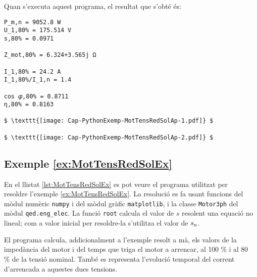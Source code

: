 Quan s'executa aquest programa, el resultat que s'obté és:
\lstset{
	language=,
	numbers=none,
	frame=none
}
\begin{lstlisting}[mathescape=true]
P_m,n = 9052.8 W
U_1,80% = 175.514 V
s,80% = 0.0971

Z_mot,80% = 6.324+3.565j Ω

I_1,80% = 24.2 A
I_1,80%/I_1,n = 1.4

cos 𝜑,80% = 0.8711
η,80% = 0.8163
	
$ \texttt{[image: Cap-PythonExemp-MotTensRedSolAp-1.pdf]} $

$ \texttt{[image: Cap-PythonExemp-MotTensRedSolAp-2.pdf]} $
\end{lstlisting} 



\hypertarget{exemple:MotTensRedSolEx}{\subsection{Exemple \ref*{ex:MotTensRedSolEx} \MotTensRedSolEx}}
En el llistat \vref{lst:MotTensRedSolEx} es pot veure el programa utilitzat per resoldre l'exemple \vref{ex:MotTensRedSolEx}. La resolució es fa usant funcions del mòdul numèric \texttt{numpy} i del mòdul gràfic \texttt{matplotlib}, i la classe \texttt{Motor3ph} del mòdul \texttt{qed.eng\_elec}. La funció \texttt{root} calcula el valor de $s$ resolent una equació no lineal; com a valor inicial per resoldre-la  s'utilitza el valor de $s_\mathrm{n}$.


El programa calcula, addicionalment a l'exemple resolt a mà, els valors de la impedància del motor i  del temps que triga el motor a arrencar, al 100 \% i al 80 \% de la tensió nominal. També es representa l'evolució temporal del  corrent d'arrencada a aquestes dues tensions.

